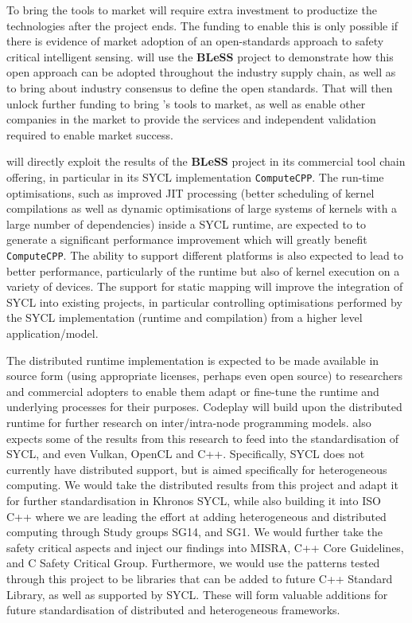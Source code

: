 \documentclass[a4paper,11pt]{article}
\newcommand{\project}[1]{\textbf{#1}\xspace}
\newcommand{\BLESS}{\project{BLeSS}}
\newcommand{\TheProject}{\BLESS}
\begin{document}
To bring the tools to market will require extra investment to productize
the technologies after the project ends. The funding to enable this is
only possible if there is evidence of market adoption of an
open-standards approach to safety critical intelligent sensing. \CODEPLAY
will use the \TheProject{} project to demonstrate how this open approach
can be adopted throughout the industry supply chain, as well as to bring
about industry consensus to define the open standards. That will then
unlock further funding to bring \CODEPLAY’s tools to market, as well as
enable other companies in the market to provide the services and
independent validation required to enable market success.

\CODEPLAYlong{} will directly exploit the results of the \TheProject{}
project in its commercial tool chain offering, in particular in its SYCL
implementation \texttt{ComputeCPP}. The run-time optimisations, such as improved
JIT processing (better scheduling of kernel compilations as well as
dynamic optimisations of large systems of kernels with a large number of
dependencies) inside a SYCL runtime, are expected to to generate a
significant performance improvement which will greatly benefit \texttt{ComputeCPP}. The
ability to support different platforms is also expected to lead to better
performance, particularly of the runtime but also of kernel execution on a
variety of devices.
%
The support for static mapping will improve the integration of SYCL into
existing projects, in particular controlling optimisations performed by
the SYCL implementation (runtime and compilation) from a higher level
application/model.

The distributed runtime implementation is expected to be made available
in source form (using appropriate licenses, perhaps even open source) to
researchers and commercial adopters to enable them adapt or fine-tune the
runtime and underlying processes for their purposes. Codeplay will build
upon the distributed runtime for further research on inter/intra-node
programming models.
%
\CODEPLAY also expects some of the results from this research to feed
into the standardisation of SYCL, and even Vulkan, OpenCL and
C++. Specifically, SYCL does not currently have distributed support, but
is aimed specifically for heterogeneous computing. We would take the
distributed results from this project and adapt it for further
standardisation in Khronos SYCL, while also building it into ISO C++
where we are leading the effort at adding heterogeneous and distributed
computing through Study groups SG14, and SG1.
%
We would further take the safety critical aspects and inject our findings
into MISRA, C++ Core Guidelines, and C Safety Critical
Group. Furthermore, we would use the patterns tested through this project
to be libraries that can be added to future C++ Standard Library, as well
as supported by SYCL. These will form valuable additions for future
standardisation of distributed and heterogeneous frameworks.
\end{document}
